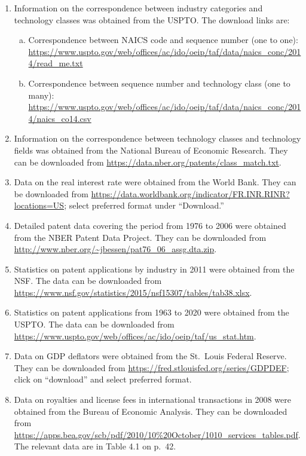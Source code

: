 \documentclass[a4paper,11pt]{article}
\begin{document}
\begin{enumerate}[(1)]
\item \label{s:corrpto} Information on the correspondence between industry categories and technology classes was obtained from the USPTO. The download links are:
\begin{enumerate}[(a)]
  \item Correspondence between NAICS code and sequence number (one to one): \url{https://www.uspto.gov/web/offices/ac/ido/oeip/taf/data/naics_conc/2014/read_me.txt}
  \item Correspondence between sequence number and technology class (one to many): \url{https://www.uspto.gov/web/offices/ac/ido/oeip/taf/data/naics_conc/2014/naics_co14.csv}
\end{enumerate}

\item \label{s:corrnber} Information on the correspondence between technology classes and technology fields was obtained from the National Bureau of Economic Research. They can be downloaded from \url{https://data.nber.org/patents/class_match.txt}.

\item \label{s:int} Data on the real interest rate were obtained from the World Bank. They can be downloaded from \url{https://data.worldbank.org/indicator/FR.INR.RINR?locations=US}; select preferred format under ``Download.''

\item \label{s:nberpat} Detailed patent data covering the period from 1976 to 2006 were obtained from the NBER Patent Data Project. They can be downloaded from \url{http://www.nber.org/~jbessen/pat76_06_assg.dta.zip}.

\item \label{s:pa2011} Statistics on patent applications by industry in 2011 were obtained from the NSF. The data can be downloaded from \url{https://www.nsf.gov/statistics/2015/nsf15307/tables/tab38.xlsx}.

\item \label{s:ptoapps} Statistics on patent applications from 1963 to 2020 were obtained from the USPTO. The data can be downloaded from \url{https://www.uspto.gov/web/offices/ac/ido/oeip/taf/us_stat.htm}.

\item \label{s:gdpdeflator} Data on GDP deflators were obtained from the St.~Louis Federal Reserve. They can be downloaded from \url{https://fred.stlouisfed.org/series/GDPDEF}; click on ``download'' and select preferred format.

\item \label{s:bea} Data on royalties and license fees in international transactions in 2008 were obtained from the Bureau of Economic Analysis. They can be downloaded from \url{https://apps.bea.gov/scb/pdf/2010/10%20October/1010_services_tables.pdf}. The relevant data are in Table 4.1 on p.~42.
\end{enumerate}
\end{document}
